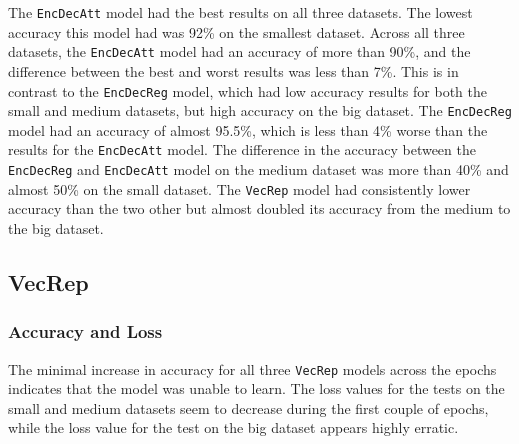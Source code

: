The {\tt EncDecAtt} model had the best results on all three datasets. The lowest accuracy this model had was 92\% on the smallest dataset. Across all three datasets, the {\tt EncDecAtt} model had an accuracy of more than 90\%, and the difference between the best and worst results was less than 7\%. This is in contrast to the {\tt EncDecReg} model, which had low accuracy results for both the small and medium datasets, but high accuracy on the big dataset. The {\tt EncDecReg} model had an accuracy of almost 95.5\%, which is less than 4\% worse than the results for the {\tt EncDecAtt} model. The difference in the accuracy between the {\tt EncDecReg} and {\tt EncDecAtt} model on the medium dataset was more than 40\% and almost 50\% on the small dataset. The {\tt VecRep} model had consistently lower accuracy than the two other but almost doubled its accuracy from the medium to the big dataset.

\subsection{VecRep}
\subsubsection{Accuracy and Loss}

The minimal increase in accuracy for all three {\tt VecRep} models across the epochs indicates that the model was unable to learn. The loss values for the tests on the small and medium datasets seem to decrease during the first couple of epochs, while the loss value for the test on the big dataset appears highly erratic.

\newpage
